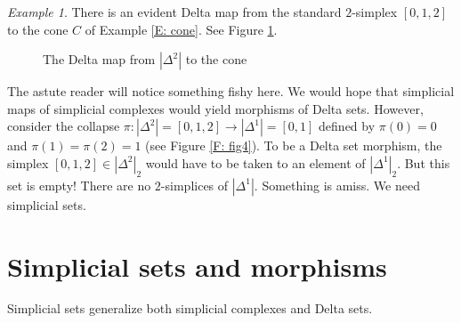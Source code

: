 \documentclass[12pt]{article}
\theoremstyle{plain}
\theoremstyle{definition}
\theoremstyle{remark}
\newtheorem{example}[theorem]{Example}
\begin{document}
\begin{example}
There is an evident Delta map from the standard $2$-simplex $[0,1,2]$ to the  cone $C$ of Example \ref{E: cone}. See Figure \ref{F: fig9}.
\end{example}


\begin{figure}[!htp]
\begin{center}
\end{center}
\caption{The Delta map from $|\Delta^2|$ to the cone}\label{F: fig9}
\end{figure}


The astute reader will notice something fishy here. We would hope that simplicial maps of simplicial complexes would yield morphisms of Delta sets. However, consider the collapse $\pi\colon|\Delta^2|=[0,1,2]\to |\Delta^1|=[0,1]$ defined by $\pi(0)=0$ and $\pi(1)=\pi(2)=1$ (see Figure \ref{F: fig4}). To be a Delta set morphism, the simplex $[0,1,2]\in |\Delta^2|_2$ would have to be taken to an element of $|\Delta^1|_2$. But this set is empty! There are no $2$-simplices of $|\Delta^1|$. Something is amiss. We need simplicial sets.













\section{Simplicial sets and morphisms}\label{S: simplicial sets}

Simplicial sets generalize both simplicial complexes and Delta sets. 
\end{document}
